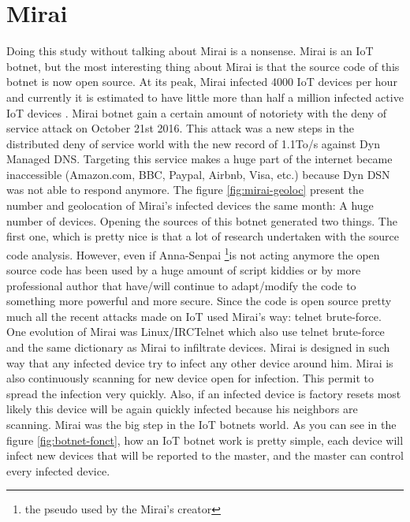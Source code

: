 \documentclass{report}
\begin{document}
\section{Mirai}
Doing this study without talking about Mirai is a nonsense. Mirai is an IoT botnet, but the most interesting thing about Mirai is that the source code of this botnet is now open source. At its peak, Mirai infected 4000 IoT devices per hour and currently it is estimated to have little more than half a million infected active IoT devices \autocite{angrishi2017turning}. Mirai botnet gain a certain amount of notoriety with the deny of service attack on October 21st 2016. This attack was a new steps in the distributed deny of service world with the new record of 1.1To/s against Dyn Managed DNS. Targeting this service makes a huge part of the internet became inaccessible (Amazon.com, BBC, Paypal, Airbnb, Visa, etc.) because Dyn DSN was not able to respond anymore. The figure \ref{fig:mirai-geoloc} present the number and geolocation of Mirai's infected devices the same month: A huge number of devices.\newline
Opening the sources of this botnet generated two things. The first one, which is pretty nice is that a lot of research undertaken with the source code analysis. However, even if Anna-Senpai \footnote{the pseudo used by the Mirai's creator}is not acting anymore the open source code has been used by a huge amount of script kiddies or by more professional author that have/will continue to adapt/modify the code to something more powerful and more secure. Since the code is open source pretty much all the recent attacks made on IoT used Mirai's way: telnet brute-force.
One evolution of Mirai was Linux/IRCTelnet which also use telnet brute-force and the same dictionary as Mirai to infiltrate devices.\newline
\newline
Mirai is designed in such way that any infected device try to infect any other device around him. Mirai is also continuously scanning for new device open for infection. This permit to spread the infection very quickly. Also, if an infected device is factory resets most likely this device will be again quickly infected because his neighbors are scanning. Mirai was the big step in the IoT botnets world.\newline
\newline
As you can see in the figure \ref{fig:botnet-fonct}, how an IoT botnet work is pretty simple, each device will infect new devices that will be reported to the master, and the master can control every infected device.\newline
\end{document}
